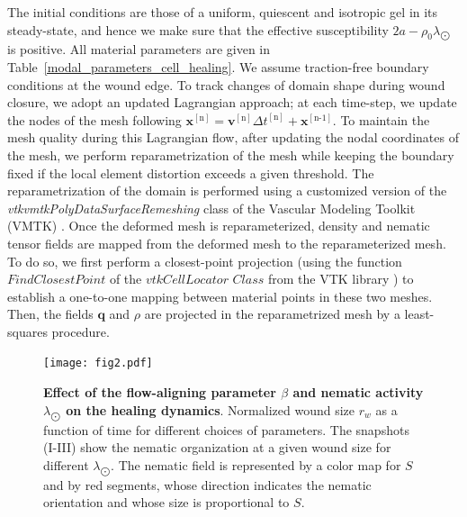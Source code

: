 \documentclass[12pt]{iopart}
\begin{document}
	The initial conditions are those of a uniform, quiescent and isotropic gel in its steady-state, and hence we make sure that the effective susceptibility $2a -  \rho_0\lambda_{\bigodot}$ is positive. All material parameters are given in Table~\ref{modal_parameters_cell_healing}. We assume traction-free boundary conditions at the wound edge. To track changes of domain shape during wound closure, we adopt an updated  Lagrangian approach; at each time-step, we update the nodes of the mesh following $\bm{x}^{[\text{n}]}  = \bm{v}^{[\text{n}]}\Delta t^{[\text{n}]}+ \bm{x}^{[\text{n-1}]}$. To maintain the mesh quality during this Lagrangian flow, after updating the nodal coordinates of the mesh, we perform reparametrization of the mesh while keeping the boundary fixed if the local element distortion  exceeds a given threshold. The reparametrization of the domain is performed using a customized version of the \textit{vtkvmtkPolyDataSurfaceRemeshing} class of the Vascular Modeling Toolkit (VMTK) \cite{antiga2008}. Once the deformed mesh is reparameterized, density and nematic tensor fields are mapped from the deformed mesh to the reparameterized mesh. To do so, we first perform a closest-point projection (using the function $\textit{FindClosestPoint}$ of the $\textit{vtkCellLocator Class}$ from the VTK library \cite{schroeder2003}) to establish a one-to-one mapping between material points in these two meshes. Then, the fields $\bm{q}$ and $\rho$ are projected in the reparametrized mesh by a least-squares procedure. 
	
	
	
	\begin{figure}[t]
		\centering
		\texttt{[image: fig2.pdf]}
		\caption{\label{sec_1_chap_3_fig_2}  \textbf{Effect of the flow-aligning parameter $\beta$ and nematic activity $\lambda_{\bigodot}$ on the healing dynamics}. Normalized wound size  $r_w$ as a function of time for different choices of parameters. The snapshots (I-III) show the nematic organization at a given wound size for different $\lambda_{\bigodot}$. The nematic field is represented by a color map for $S$ and by red segments, whose direction indicates the nematic orientation and whose size is proportional to $S$.}
	\end{figure}
	
\end{document}
